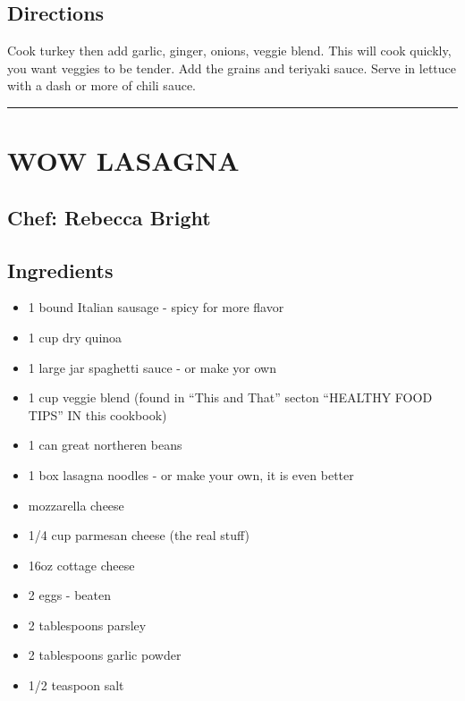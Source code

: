 \documentclass[
]{book}
\providecommand{\tightlist}{%
  \setlength{\itemsep}{0pt}\setlength{\parskip}{0pt}}
\begin{document}
\hypertarget{directions-71}{%
\subsection*{Directions}\label{directions-71}}


Cook turkey then add garlic, ginger, onions, veggie blend. This will cook quickly, you want veggies to be tender.
Add the grains and teriyaki sauce. Serve in lettuce with a dash or more of chili sauce.

\begin{center}\rule{0.5\linewidth}{0.5pt}\end{center}

\hypertarget{wow-lasagna}{%
\section*{WOW LASAGNA}\label{wow-lasagna}}


\hypertarget{chef-rebecca-bright-6}{%
\subsection*{Chef: Rebecca Bright}\label{chef-rebecca-bright-6}}


\hypertarget{ingredients-72}{%
\subsection*{Ingredients}\label{ingredients-72}}


\begin{itemize}
\tightlist
\item
  1 bound Italian sausage - spicy for more flavor
\item
  1 cup dry quinoa
\item
  1 large jar spaghetti sauce - or make yor own
\item
  1 cup veggie blend (found in ``This and That'' secton ``HEALTHY FOOD TIPS'' IN this cookbook)
\item
  1 can great northeren beans
\item
  1 box lasagna noodles - or make your own, it is even better
\item
  mozzarella cheese
\item
  1/4 cup parmesan cheese (the real stuff)
\item
  16oz cottage cheese
\item
  2 eggs - beaten
\item
  2 tablespoons parsley
\item
  2 tablespoons garlic powder
\item
  1/2 teaspoon salt
\end{itemize}
\end{document}
